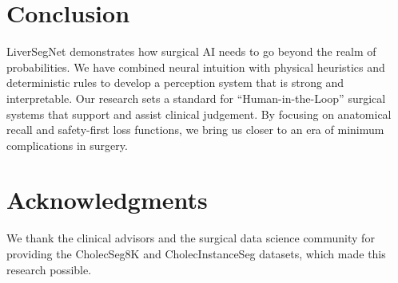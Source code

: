 \documentclass[conference]{IEEEtran}
\begin{document}
\section{Conclusion}
LiverSegNet demonstrates how surgical AI needs to go beyond the realm of probabilities. We have combined neural intuition with physical heuristics and deterministic rules to develop a perception system that is strong and interpretable. Our research sets a standard for ``Human-in-the-Loop'' surgical systems that support and assist clinical judgement. By focusing on anatomical recall and safety-first loss functions, we bring us closer to an era of minimum complications in surgery.

\section*{Acknowledgments}
We thank the clinical advisors and the surgical data science community for providing the CholecSeg8K and CholecInstanceSeg datasets, which made this research possible.
\end{document}
